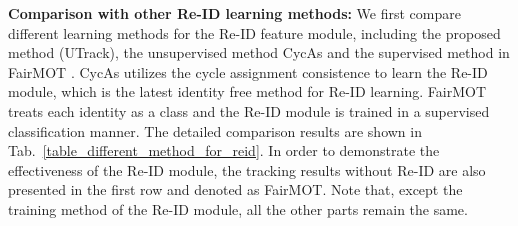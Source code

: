 \documentclass[final,1p,times,twocolumn]{elsarticle}
\newcommand{\tref}[1]{Tab.~\ref{#1}}
\begin{document}
	
	\begin{table}
		\caption{Tracking results on the MOT17 validation set with respect to different Re-ID learning methods.  FairMOT\textsuperscript{\ref{ourself_trained_fairmot}} and FairMOT mean the results with or without the original supervised Re-ID method used in FairMOT.
			 means the larger the better and   means the smaller the better.
			Best results are shown in \textbf{bold} and highlighted with underline.
		}
		\setlength{\tabcolsep}{0.1pt}
		\centering
\scriptsize
		\label{table_different_method_for_reid}
	\end{table}	
	
	\textbf{Comparison with other Re-ID learning methods: }
	We first compare different learning methods for the Re-ID feature module, including the proposed method (UTrack), the   unsupervised method CycAs \cite{wang2020cycas} and the supervised method in FairMOT \cite{zhang2020fairmot}.  CycAs utilizes the cycle assignment consistence to learn the Re-ID module, which is the latest identity free method for Re-ID learning. FairMOT treats each identity as a class and the Re-ID module is trained in a supervised classification manner. The detailed comparison results are shown in \tref{table_different_method_for_reid}. In order to demonstrate the effectiveness of the Re-ID module, the tracking results without Re-ID are also presented in the first row and denoted as FairMOT. Note that, except the training method of the Re-ID module, all the other parts remain the same. 
	
\end{document}
